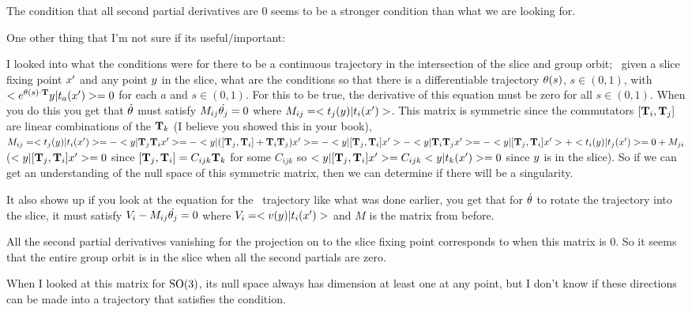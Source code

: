 \begin{description}
The condition that all second partial derivatives are 0 seems to be a stronger condition than what we are looking for.

One other thing that I'm not sure if its useful/important:

I looked into what the conditions were for there to be a continuous trajectory in the intersection of the slice and group orbit; \ie\ given a slice fixing point $x'$ and any point $y$ in the slice, what are the conditions so that there is a differentiable trajectory ${\bf \theta}(s)$, $s\in(0,1)$, with $<e^{{\bf \theta}(s)\cdot \mathbf{T}}y|t_a(x')>=0$ for each $a$ and $s\in(0,1)$. For this to be true, the derivative of this equation must be zero for all $s\in(0,1)$.
When you do this you get that $\dot{{\bf \theta}}$ must satisfy $M_{ij}\dot{{\bf \theta}_j}=0$ where $M_{ij}=<t_j(y)|t_i(x')>$. This matrix is symmetric since the commutators $[\mathbf{T}_i,\mathbf{T}_j]$ are linear combinations of the $\mathbf{T}_k$ (I believe you showed this in your book), $M_{ij}=<t_j(y)|t_i(x')>=-<y|\mathbf{T}_j \mathbf{T}_i x'>=-<y|([\mathbf{T}_j,\mathbf{T}_i]+\mathbf{T}_i \mathbf{T}_j)x'>=-<y|[\mathbf{T}_j,\mathbf{T}_i]x'>-<y|\mathbf{T}_i \mathbf{T}_j x'>=-<y|[\mathbf{T}_j,\mathbf{T}_i]x'>+<t_i(y)| t_j(x')>=0+M_{ji}$ ($<y|[\mathbf{T}_j,\mathbf{T}_i]x'>=0$ since $[\mathbf{T}_j,\mathbf{T}_i]=C_{ijk}\mathbf{T}_k$ for some $C_{ijk}$ so $<y|[\mathbf{T}_j,\mathbf{T}_i]x'>=C_{ijk}<y|t_k(x')>=0$ since $y$ is in the slice).
So if we can get an understanding of the null space of this symmetric matrix, then we can determine if there will be a singularity.

It also shows up if you look at the equation for the \reducedsp\ trajectory like what was done earlier, you get that for $\dot{{\bf \theta}}$ to rotate the trajectory into the slice, it must satisfy $V_i-M_{ij}\dot{{\bf \theta}_j}=0$ where $V_i=<v(y)|t_i(x')>$ and $M$ is the matrix from before.

All the second partial derivatives vanishing for the projection on to the slice fixing point corresponds to when this matrix is 0. So it seems that the entire group orbit is in the slice when all the second partials are zero.

When I looked at this matrix for $\textrm{SO}(3)$, its null space always has dimension at least one at any point, but I don't know if these directions can be made into a trajectory that satisfies the condition.


\end{description}
